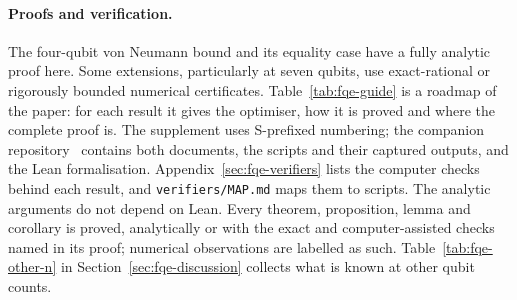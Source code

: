 \documentclass[11pt]{article}
\begin{document}
\paragraph{Proofs and verification.} The four-qubit von Neumann bound and its
equality case have a fully analytic proof here. Some extensions, particularly at
seven qubits, use exact-rational or rigorously bounded numerical certificates.
Table~\ref{tab:fqe-guide} is a roadmap of the paper: for each result it gives the optimiser, how it is proved
and where the complete proof is. The supplement uses S-prefixed numbering; the companion
repository~\cite{Companion} contains both documents, the scripts and their
captured outputs, and the Lean formalisation. Appendix~\ref{sec:fqe-verifiers} lists the computer checks
behind each result, and \texttt{verifiers/MAP.md} maps them to scripts. The analytic arguments do not depend on Lean.
Every theorem, proposition, lemma and corollary is proved, analytically or with the exact and computer-assisted checks named in its proof; numerical observations are labelled as such. Table~\ref{tab:fqe-other-n} in Section~\ref{sec:fqe-discussion} collects what is known at other qubit counts.
\end{document}

